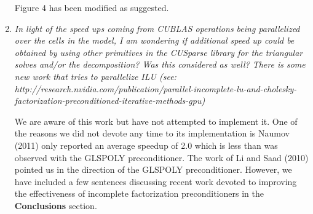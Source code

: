 \documentclass[12pt]{article} %
\begin{document}
\begin{enumerate}
Figure 4 has been modified as suggested.

\item \textit{In light of the speed ups coming from CUBLAS operations being parallelized over the cells in the model, I am wondering if additional speed up could be obtained by using other primitives in the CUSparse library for the triangular solves and/or the decomposition? Was this considered as well? There is some new work that tries to parallelize ILU (see: http://research.nvidia.com/publication/parallel-incomplete-lu-and-cholesky-factorization-preconditioned-iterative-methods-gpu) } 

We are aware of this work but have not attempted to implement it. One of the reasons we did not devote any time to its implementation is Naumov (2011) only reported an average speedup of 2.0 which is less than was observed with the GLSPOLY preconditioner. The work of Li and Saad (2010) pointed us in the direction of the GLSPOLY preconditioner. However, we have included a few sentences discussing recent work devoted to improving the effectiveness of incomplete factorization preconditioners in the \textbf{Conclusions} section.


\end{enumerate}
\end{document}
